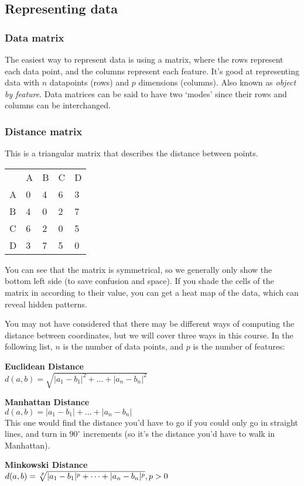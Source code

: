 \subsection{Representing data}

\subsubsection{Data matrix}

The easiest way to represent data is using a matrix, where the rows represent
each data point, and the columns represent each feature. It's good at
representing data with $n$ datapoints (rows) and $p$ dimensions (columns). Also
known as \textit{object by feature}. Data matrices can be said to have two
`modes' since their rows and columns can be interchanged.

\subsubsection{Distance matrix}

This is a triangular matrix that describes the distance between points.

\begin{center}
  \begin{tabular}{lllll}
      & A & B & C & D\\
    A & 0 & 4 & 6 & 3\\
    B & 4 & 0 & 2 & 7\\
    C & 6 & 2 & 0 & 5\\
    D & 3 & 7 & 5 & 0
  \end{tabular}
\end{center}

You can see that the matrix is symmetrical, so we generally only show the bottom
left side (to save confusion and space). If you shade the cells of the matrix in
according to their value, you can get a heat map of the data, which can reveal
hidden patterns.

You may not have considered that there may be different ways of computing the
distance between coordinates, but we will cover three ways in this course. In
the following list, $n$ is the number of data points, and $p$ is the number of
features:

\begin{description}
  \item \textbf{Euclidean Distance}\\ 
    $d(a,b) = \sqrt{|a_1 - b_1|^2 + \dots + |a_n - b_n|^2}$
  \item \textbf{Manhattan Distance}\\
    $d(a,b) = |a_1 - b_1| + \dots + |a_n - b_n|$\\
    This one would find the distance you'd have to go if you could only go in
    straight lines, and turn in $90^{\circ}$ increments (so it's the distance
    you'd have to walk in Manhattan).
  \item \textbf{Minkowski Distance}\\
    $d(a,b) = \sqrt[\leftroot{-2}\uproot{2}p]{|a_1 - b_1|^p + \dots + |a_n - b_n|^p}, p > 0$
\end{description}

